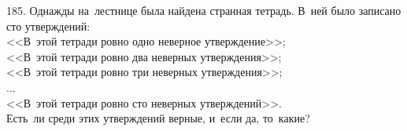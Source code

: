 185. Однажды на лестнице была найдена странная тетрадь. В ней было записано сто утверждений:\\
<<В этой тетради ровно одно неверное утверждение>>;\\
<<В этой тетради ровно два неверных утверждения>>;\\
<<В этой тетради ровно три неверных утверждения>>;\\
...\\
<<В этой тетради ровно сто неверных утверждений>>.\\
Есть ли среди этих утверждений верные, и если да, то какие?\\
